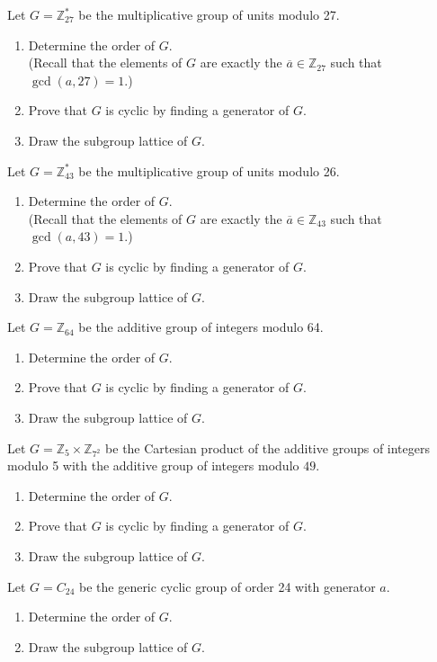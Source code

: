 
\newcommand{\Z}{\mathbb{Z}}
\newcommand{\abar}{\overline{a}}
\usepackage{enumitem}


Let $G = \Z_{27}^*$ be the multiplicative group of units modulo 27.  
\begin{enumerate}[label=(\alph*)]
	\item Determine the order of $G$.\\
	(Recall that the elements of $G$ are exactly the $\abar\in \Z_{27}$ such that $\gcd(a,27)=1$.)
	\vskip 1in
	\item Prove that $G$ is cyclic by finding a generator of $G$.
	\vskip 2in
	\item Draw the subgroup lattice of $G$.
\end{enumerate}
	

Let $G = \Z_{43}^*$ be the multiplicative group of units modulo 26.  
\begin{enumerate}[label=(\alph*)]
	\item Determine the order of $G$.\\
	(Recall that the elements of $G$ are exactly the $\abar\in \Z_{43}$ such that $\gcd(a,43)=1$.)
	\vskip 1in
	\item Prove that $G$ is cyclic by finding a generator of $G$.
	\vskip 2in
	\item Draw the subgroup lattice of $G$.
\end{enumerate}


Let $G=\Z_{64}$ be the additive group of integers modulo 64.
\begin{enumerate}[label=(\alph*)]
	\item Determine the order of $G$.
	\vskip 1in
	\item Prove that $G$ is cyclic by finding a generator of $G$.
	\vskip 2in
	\item Draw the subgroup lattice of $G$.
\end{enumerate}
	

Let $G=\Z_{5}\times \Z_{7^2}$ be the Cartesian product of the additive groups of integers modulo 5 with the additive group of integers modulo $49$.
\begin{enumerate}[label=(\alph*)]
	\item Determine the order of $G$.
	\vskip 1in
	\item Prove that $G$ is cyclic by finding a generator of $G$.
	\vskip 2in
	\item Draw the subgroup lattice of $G$.
\end{enumerate}


Let $G=C_{24}$ be the generic cyclic group of order 24 with generator $a$.
\begin{enumerate}[label=(\alph*)]
	\item Determine the order of $G$.
	\vskip 1in
	\item Draw the subgroup lattice of $G$.
\end{enumerate}
